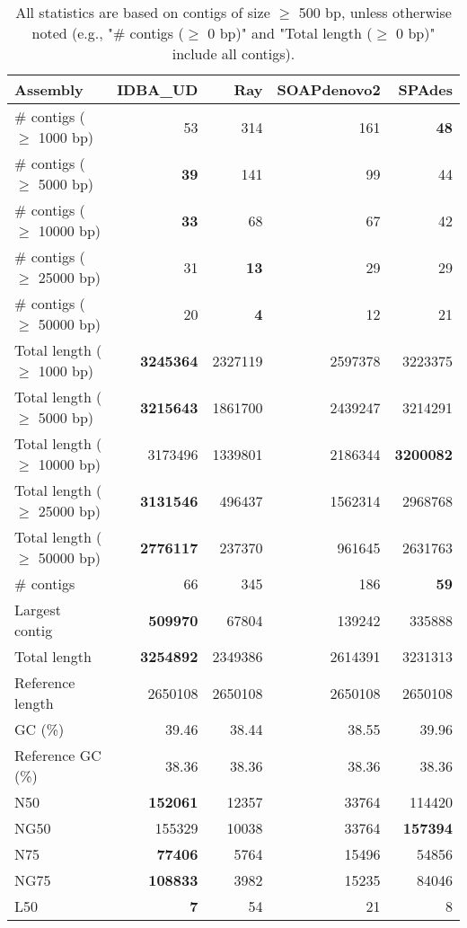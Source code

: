 \documentclass[12pt,a4paper]{article}
\begin{document}
\begin{table}[ht]
\begin{center}
\caption{All statistics are based on contigs of size $\geq$ 500 bp, unless otherwise noted (e.g., "\# contigs ($\geq$ 0 bp)" and "Total length ($\geq$ 0 bp)" include all contigs).}
\begin{tabular}{|l*{4}{|r}|}
\hline
Assembly & IDBA\_UD & Ray & SOAPdenovo2 & SPAdes \\ \hline
\# contigs ($\geq$ 1000 bp) & 53 & 314 & 161 & {\bf 48} \\ \hline
\# contigs ($\geq$ 5000 bp) & {\bf 39} & 141 & 99 & 44 \\ \hline
\# contigs ($\geq$ 10000 bp) & {\bf 33} & 68 & 67 & 42 \\ \hline
\# contigs ($\geq$ 25000 bp) & 31 & {\bf 13} & 29 & 29 \\ \hline
\# contigs ($\geq$ 50000 bp) & 20 & {\bf 4} & 12 & 21 \\ \hline
Total length ($\geq$ 1000 bp) & {\bf 3245364} & 2327119 & 2597378 & 3223375 \\ \hline
Total length ($\geq$ 5000 bp) & {\bf 3215643} & 1861700 & 2439247 & 3214291 \\ \hline
Total length ($\geq$ 10000 bp) & 3173496 & 1339801 & 2186344 & {\bf 3200082} \\ \hline
Total length ($\geq$ 25000 bp) & {\bf 3131546} & 496437 & 1562314 & 2968768 \\ \hline
Total length ($\geq$ 50000 bp) & {\bf 2776117} & 237370 & 961645 & 2631763 \\ \hline
\# contigs & 66 & 345 & 186 & {\bf 59} \\ \hline
Largest contig & {\bf 509970} & 67804 & 139242 & 335888 \\ \hline
Total length & {\bf 3254892} & 2349386 & 2614391 & 3231313 \\ \hline
Reference length & 2650108 & 2650108 & 2650108 & 2650108 \\ \hline
GC (\%) & 39.46 & 38.44 & 38.55 & 39.96 \\ \hline
Reference GC (\%) & 38.36 & 38.36 & 38.36 & 38.36 \\ \hline
N50 & {\bf 152061} & 12357 & 33764 & 114420 \\ \hline
NG50 & 155329 & 10038 & 33764 & {\bf 157394} \\ \hline
N75 & {\bf 77406} & 5764 & 15496 & 54856 \\ \hline
NG75 & {\bf 108833} & 3982 & 15235 & 84046 \\ \hline
L50 & {\bf 7} & 54 & 21 & 8 \\ \hline

\end{tabular}
\end{center}
\end{table}
\end{document}
